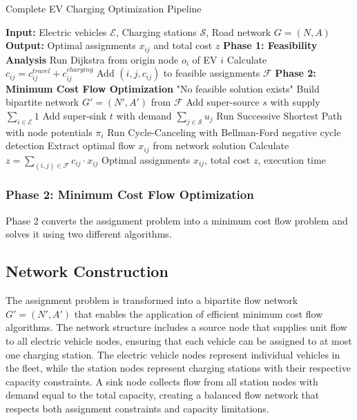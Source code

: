 \documentclass[12pt,a4paper]{article}
\begin{document}
\begin{algorithm}[H]
\caption{Complete EV Charging Optimization Pipeline}
\begin{algorithmic}[1]
\STATE \textbf{Input:} Electric vehicles $\mathcal{E}$, Charging stations $\mathcal{S}$, Road network $G = (N, A)$
\STATE \textbf{Output:} Optimal assignments $x_{ij}$ and total cost $z$
\STATE
\STATE \textbf{Phase 1: Feasibility Analysis}
    \STATE Run Dijkstra from origin node $o_i$ of EV $i$
            \STATE Calculate $c_{ij} = c_{ij}^{travel} + c_{ij}^{charging}$
            \STATE Add $(i, j, c_{ij})$ to feasible assignments $\mathcal{F}$
        \ENDIF
    \ENDFOR
\ENDFOR
\STATE
\STATE \textbf{Phase 2: Minimum Cost Flow Optimization}
    \RETURN "No feasible solution exists"
\ENDIF
\STATE Build bipartite network $G' = (N', A')$ from $\mathcal{F}$
\STATE Add super-source $s$ with supply $\sum_{i \in \mathcal{E}} 1$
\STATE Add super-sink $t$ with demand $\sum_{j \in \mathcal{S}} u_j$
\STATE
{}
    \STATE Run Successive Shortest Path with node potentials $\pi_i$
    \STATE Run Cycle-Canceling with Bellman-Ford negative cycle detection
\ENDIF
\STATE
\STATE Extract optimal flow $x_{ij}$ from network solution
\STATE Calculate $z = \sum_{(i,j) \in \mathcal{F}} c_{ij} \cdot x_{ij}$
\RETURN Optimal assignments $x_{ij}$, total cost $z$, execution time
\end{algorithmic}
\end{algorithm}

\subsubsection{Phase 2: Minimum Cost Flow Optimization}

Phase 2 converts the assignment problem into a minimum cost flow problem and solves it using two different algorithms.

\subsection{Network Construction}

The assignment problem is transformed into a bipartite flow network $G' = (N', A')$ that enables the application of efficient minimum cost flow algorithms. The network structure includes a source node that supplies unit flow to all electric vehicle nodes, ensuring that each vehicle can be assigned to at most one charging station. The electric vehicle nodes represent individual vehicles in the fleet, while the station nodes represent charging stations with their respective capacity constraints. A sink node collects flow from all station nodes with demand equal to the total capacity, creating a balanced flow network that respects both assignment constraints and capacity limitations.
\end{document}
